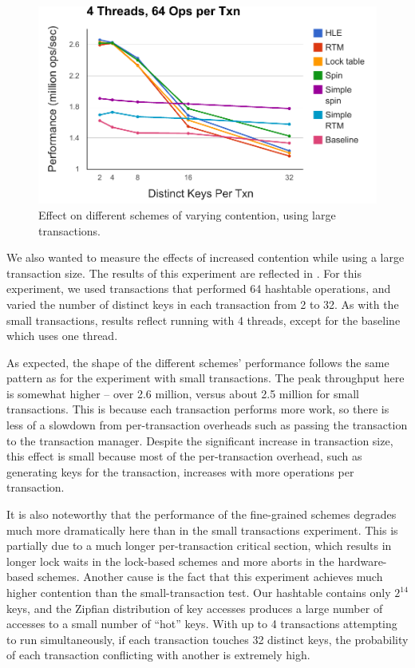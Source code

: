 \begin{figure}[h!]
  \centering
  \includegraphics[scale=0.575]{figure/large_txns.pdf}
  \caption{Effect on different schemes of varying contention, using large
    transactions.}
  \label{fig:large_txns} 
\end{figure}

We also wanted to measure the effects of increased contention while using a
large transaction size. The results of this experiment are reflected in
. For this experiment, we used transactions that performed
64 hashtable operations, and varied the number of distinct keys in each
transaction from 2 to 32. As with the small transactions, results reflect
running with 4 threads, except for the baseline which uses one thread.

As expected, the shape of the different schemes' performance follows the same
pattern as for the experiment with small transactions. The peak throughput here
is somewhat higher -- over 2.6 million, versus about 2.5 million for small
transactions. This is because each transaction performs more work, so there is
less of a slowdown from per-transaction overheads such as passing the
transaction to the transaction manager. Despite the significant increase in
transaction size, this effect is small because most of the per-transaction
overhead, such as generating keys for the transaction, increases with more
operations per transaction.

It is also noteworthy that the performance of the fine-grained schemes degrades
much more dramatically here than in the small transactions experiment. This is
partially due to a much longer per-transaction critical section, which results
in longer lock waits in the lock-based schemes and more aborts in the
hardware-based schemes. Another cause is the fact that this experiment achieves
much higher contention than the small-transaction test. Our hashtable contains
only $2^{14}$ keys, and the Zipfian distribution of key accesses produces a
large number of accesses to a small number of ``hot'' keys. With up to 4
transactions attempting to run simultaneously, if each transaction touches 32
distinct keys, the probability of each transaction conflicting with another is
extremely high.

